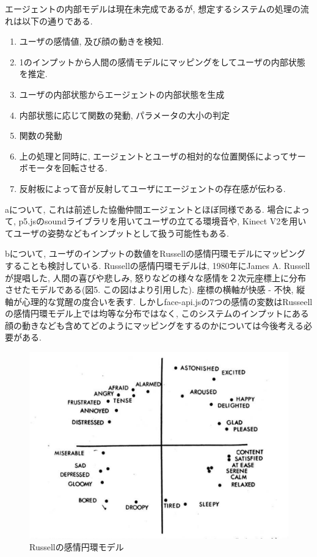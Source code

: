 \documentclass[a4paper,dvipdfmx]{hisken}
\begin{document}
\begin{enumerate}
エージェントの内部モデルは現在未完成であるが, 想定するシステムの処理の流れは以下の通りである.

\begin{enumerate}
\item ユーザの感情値, 及び顔の動きを検知.
\item 1のインプットから人間の感情モデルにマッピングをしてユーザの内部状態を推定.
\item ユーザの内部状態からエージェントの内部状態を生成
\item 内部状態に応じて関数の発動, パラメータの大小の判定
\item 関数の発動
\item 上の処理と同時に, エージェントとユーザの相対的な位置関係によってサーボモータを回転させる.
\item 反射板によって音が反射してユーザにエージェントの存在感が伝わる.
\end{enumerate}


aについて, これは前述した協働仲間エージェントとほぼ同様である. 場合によって, p5.jsのsoundライブラリを用いてユーザの立てる環境音や, Kinect V2を用いてユーザの姿勢などもインプットとして扱う可能性もある.

bについて, ユーザのインプットの数値をRussellの感情円環モデルにマッピングすることも検討している. Russellの感情円環モデルは, 1980年にJames A. Russellが提唱した, 人間の喜びや悲しみ, 怒りなどの様々な感情を２次元座標上に分布させたモデルである{}\cite{tex10}(図5. この図は{}\cite{tex10}より引用した). 座標の横軸が快感 - 不快, 縦軸が心理的な覚醒の度合いを表す. しかしface-api.jsの7つの感情の変数はRusseellの感情円環モデル上では均等な分布ではなく, このシステムのインプットにある顔の動きなども含めてどのようにマッピングをするのかについては今後考える必要がある.

\begin{figure}
  \includegraphics[width=\linewidth]{CircumplexModel.png}
  \caption{Russellの感情円環モデル}
  \label{fig:CircumplexMode}
\end{figure}



\end{enumerate}
\end{document}
